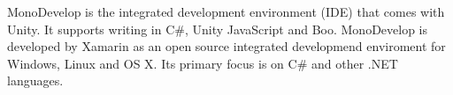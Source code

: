 MonoDevelop is the integrated development environment (IDE) that comes with Unity. It supports writing in C\#, Unity JavaScript and Boo.
MonoDevelop is developed by Xamarin \cite{xamarinRef} as an open source integrated developmend enviroment for Windows, Linux and OS X.
Its primary focus is on C\# and other .NET languages.